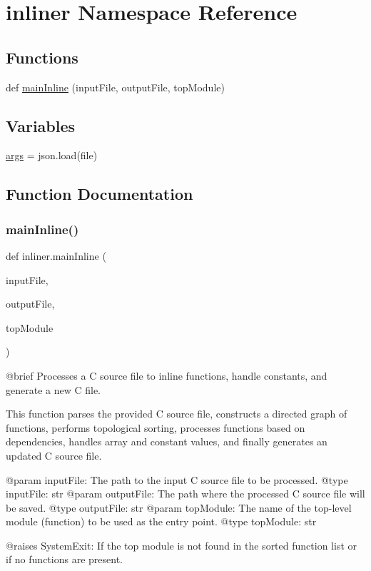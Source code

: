 \hypertarget{namespaceinliner}{}\section{inliner Namespace Reference}
\label{namespaceinliner}
\subsection*{Functions}
\begin{DoxyCompactItemize}
\item 
def \hyperlink{namespaceinliner_a85ff5417ce309a641abfa41d26e8d7f3}{main\+Inline} (input\+File, output\+File, top\+Module)
\end{DoxyCompactItemize}
\subsection*{Variables}
\begin{DoxyCompactItemize}
\item 
\hyperlink{namespaceinliner_a8187411843a6284ffb964ef3fb9fcab3}{args} = json.\+load(file)
\end{DoxyCompactItemize}


\subsection{Function Documentation}
\mbox{\label{namespaceinliner_a85ff5417ce309a641abfa41d26e8d7f3}} 
\subsubsection{\texorpdfstring{main\+Inline()}{mainInline()}}
{\footnotesize\ttfamily def inliner.\+main\+Inline (\begin{DoxyParamCaption}\item[{}]{input\+File,  }\item[{}]{output\+File,  }\item[{}]{top\+Module }\end{DoxyParamCaption})}

\begin{DoxyVerb}@brief Processes a C source file to inline functions, handle constants, and generate a new C file.

This function parses the provided C source file, constructs a directed graph of functions, performs topological
sorting, processes functions based on dependencies, handles array and constant values, and finally generates
an updated C source file.

@param inputFile: The path to the input C source file to be processed.
@type inputFile: str
@param outputFile: The path where the processed C source file will be saved.
@type outputFile: str
@param topModule: The name of the top-level module (function) to be used as the entry point.
@type topModule: str

@raises SystemExit: If the top module is not found in the sorted function list or if no functions are present.
\end{DoxyVerb}
 


